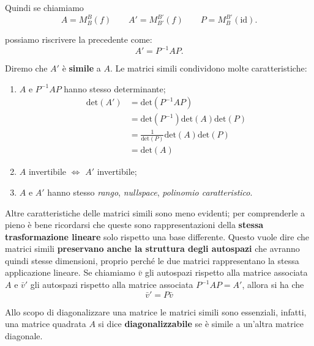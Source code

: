 \documentclass[x11names]{article}
\begin{document}
\noindent
Quindi se chiamiamo
\[
A = M^{B}_{B}\left(f\right) \qquad A' = M^{B'}_{B'}\left(f\right) \qquad P = M^{B'}_{B}\left(\text{id}\right)
.\] 

\noindent
possiamo riscrivere la precedente come:
\[
A' = P^{-1} A P
.\] 

\noindent
Diremo che $A'$ è  \textbf{simile} a $A$. Le matrici simili condividono molte caratteristiche:
\begin{enumerate}
	\item $A$ e  $P^{-1}AP$ hanno stesso determinante;
\begin{align*}
	\text{det}\left(A'\right) &= \text{det}\left(P^{-1}AP\right)\\ 
		   &= \text{det}\left(P^{-1}\right)\text{det}\left(A\right)\text{det}\left(P\right) \\
		   &= \frac{1}{\text{det}\left(P\right)} \text{det}\left(A\right) \text{det}\left(P\right) \\
		   &=\text{det}\left(A\right)
\end{align*}
\item $A$ invertibile  $\Longleftrightarrow$  $A'$ invertibile;
\item  $A$ e  $A'$ hanno stesso  \textit{rango}, \textit{nullspace}, \textit{polinomio caratteristico}.
\end{enumerate}

\noindent
Altre caratteristiche delle matrici simili sono meno evidenti; per comprenderle a pieno è bene ricordarsi che queste sono rappresentazioni della \textbf{stessa trasformazione lineare} solo rispetto una base differente. Questo vuole dire che matrici simili \textbf{preservano anche la struttura degli autospazi} che avranno quindi stesse dimensioni, proprio perché le due matrici rappresentano la stessa applicazione lineare. Se chiamiamo $\bar{v}$ gli autospazi rispetto alla matrice associata $A$ e $\bar{v}'$ gli autospazi rispetto alla matrice associata $P^{-1}AP = A'$, allora si ha che 
\[
\bar{v}' = P\bar{v}
\]

\noindent
Allo scopo di diagonalizzare una matrice le matrici simili sono essenziali, infatti, una matrice quadrata $A$ si dice \textbf{diagonalizzabile} se è simile a un'altra matrice diagonale.
\end{document}
